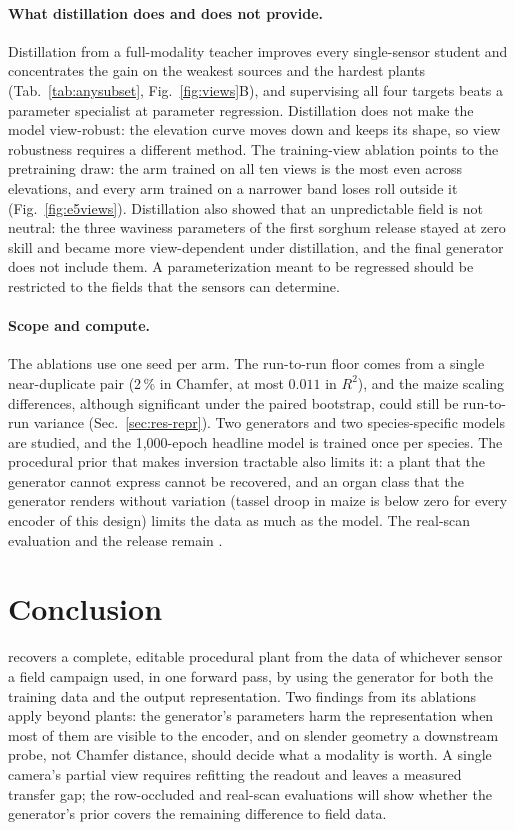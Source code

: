 \paragraph{What distillation does and does not provide.}
Distillation from a full-modality teacher improves every single-sensor student
and concentrates the gain on the weakest sources and the hardest plants
(Tab.~\ref{tab:anysubset}, Fig.~\ref{fig:views}B), and supervising all four
targets beats a parameter specialist at parameter regression. Distillation does
not make the model view-robust: the elevation curve moves down and keeps its
shape, so view robustness requires a different method. The training-view
ablation points to the pretraining draw: the arm trained on all ten views is the
most even across elevations, and every arm trained on a narrower band loses roll
outside it (Fig.~\ref{fig:e5views}). Distillation also
showed that an unpredictable field is not neutral: the three waviness parameters
of the first sorghum release stayed at zero skill and became more view-dependent
under distillation, and the final generator does not include them. A
parameterization meant to be regressed should be restricted to the fields that
the sensors can determine.

\paragraph{Scope and compute.}
The ablations use one seed per arm. The run-to-run floor comes from a single
near-duplicate pair (2\,\% in Chamfer, at most $0.011$ in $R^2$), and the maize
scaling differences, although significant under the paired bootstrap, could
still be run-to-run variance (Sec.~\ref{sec:res-repr}). Two generators and two
species-specific models are studied, and the 1{,}000-epoch headline model is
trained once per species. The procedural prior that makes inversion tractable
also limits it: a plant that the generator cannot express cannot be recovered,
and an organ class that the generator renders without variation (tassel droop in
maize is below zero for every encoder of this design) limits the data as much as
the model. The real-scan evaluation and the \FieldProc{} release remain
.

\section{Conclusion}
\label{sec:conclusion}

\CropCode{} recovers a complete, editable procedural plant from the data of
whichever sensor a field campaign used, in one forward pass, by using the
generator for both the training data and the output representation. Two
findings from its ablations apply beyond plants: the generator's parameters
harm the representation when most of them are visible to the encoder, and on
slender geometry a
downstream probe, not Chamfer distance, should decide what a modality is worth.
A single camera's partial view requires refitting the readout and leaves a
measured transfer gap; the row-occluded and real-scan evaluations will show
whether the generator's prior covers the remaining difference to field data.
